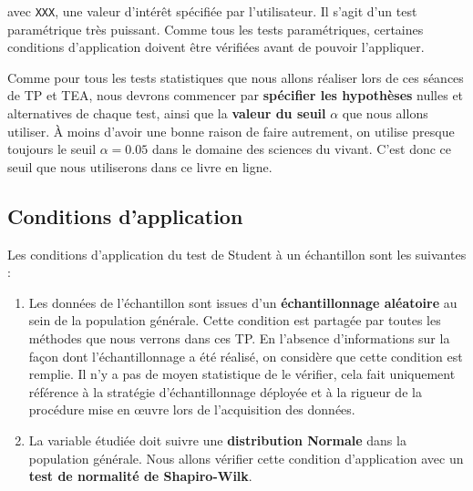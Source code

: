 \documentclass[
  french,
  a4paper,
  DIV=11,
  numbers=noendperiod,
  oneside]{scrreprt}
\providecommand{\tightlist}{%
  \setlength{\itemsep}{0pt}\setlength{\parskip}{0pt}}
\begin{document}
avec \texttt{XXX}, une valeur d'intérêt spécifiée par l'utilisateur. Il
s'agit d'un test paramétrique très puissant. Comme tous les tests
paramétriques, certaines conditions d'application doivent être vérifiées
avant de pouvoir l'appliquer.

\begin{tcolorbox}[enhanced jigsaw, arc=.35mm, bottomrule=.15mm, bottomtitle=1mm, breakable, colback=white, colbacktitle=quarto-callout-important-color!10!white, colframe=quarto-callout-important-color-frame, coltitle=black, left=2mm, leftrule=.75mm, opacityback=0, opacitybacktitle=0.6, rightrule=.15mm, title=\textcolor{quarto-callout-important-color}{\faExclamation}\hspace{0.5em}{Important}, titlerule=0mm, toprule=.15mm, toptitle=1mm]

Comme pour tous les tests statistiques que nous allons réaliser lors de
ces séances de TP et TEA, nous devrons commencer par \textbf{spécifier
les hypothèses} nulles et alternatives de chaque test, ainsi que la
\textbf{valeur du seuil} \(\alpha\) que nous allons utiliser. À moins
d'avoir une bonne raison de faire autrement, on utilise presque toujours
le seuil \(\alpha = 0.05\) dans le domaine des sciences du vivant. C'est
donc ce seuil que nous utiliserons dans ce livre en ligne.

\end{tcolorbox}

\subsection{Conditions d'application}\label{sec-norm}

Les conditions d'application du test de Student à un échantillon sont
les suivantes :

\begin{enumerate}
\def\labelenumi{\arabic{enumi}.}
\tightlist
\item
  Les données de l'échantillon sont issues d'un \textbf{échantillonnage
  aléatoire} au sein de la population générale. Cette condition est
  partagée par toutes les méthodes que nous verrons dans ces TP. En
  l'absence d'informations sur la façon dont l'échantillonnage a été
  réalisé, on considère que cette condition est remplie. Il n'y a pas de
  moyen statistique de le vérifier, cela fait uniquement référence à la
  stratégie d'échantillonnage déployée et à la rigueur de la procédure
  mise en œuvre lors de l'acquisition des données.
\item
  La variable étudiée doit suivre une \textbf{distribution Normale} dans
  la population générale. Nous allons vérifier cette condition
  d'application avec un \textbf{test de normalité de Shapiro-Wilk}.
\end{enumerate}
\end{document}
